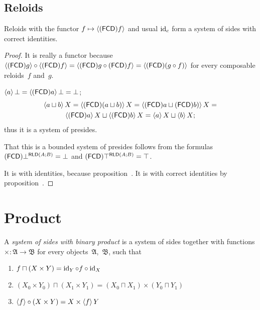 \subsection{Reloids}

\begin{prop}
Reloids with the functor $f\mapsto\left\langle (\mathsf{FCD}) f\right\rangle$ and usual $\operatorname{id}_c$ form a system of sides with correct identities.
\end{prop}

\begin{proof}
It is really a functor because
$\left\langle (\mathsf{FCD}) g\right\rangle\circ\left\langle (\mathsf{FCD}) f\right\rangle = \left\langle (\mathsf{FCD}) g\circ(\mathsf{FCD}) f\right\rangle = \left\langle (\mathsf{FCD})(g\circ f)\right\rangle$
for every composable reloids~$f$ and~$g$.

$\left\langle a\right\rangle\bot = \left\langle (\mathsf{FCD}) a\right\rangle\bot = \bot$;
\begin{multline*}
\left\langle a\sqcup b\right\rangle X = \left\langle (\mathsf{FCD})(a\sqcup b)\right\rangle X = \left\langle (\mathsf{FCD}) a\sqcup(\mathsf{FCD}) b)\right\rangle X = \\
\left\langle (\mathsf{FCD}) a\right\rangle X\sqcup\left\langle (\mathsf{FCD}) b\right\rangle X = \left\langle a\right\rangle X\sqcup\left\langle b\right\rangle X;
\end{multline*}
thus it is a system of presides.

That this is a bounded system of presides follows from the formulas
$(\mathsf{FCD})\bot^{\mathsf{RLD}(A;B)}=\bot$ and $(\mathsf{FCD})\top^{\mathsf{RLD}(A;B)}=\top$.

It is with identities, because proposition~.
It is with correct identities by proposition~.
\end{proof}



\section{Product}

\begin{defn}
A \emph{system of sides with binary product} is a system of sides together with functions $\mathord{\times}:\mathfrak{A}\rightarrow\mathfrak{B}$
for every objects~$\mathfrak{A}$,~$\mathfrak{B}$, such that
\begin{enumerate}
\item \label{f-c-x-y}$f\sqcap(X\times Y) = \operatorname{id}_Y\circ f\circ\operatorname{id}_X$
\item \label{f-xy-x0y0}$(X_0\times Y_0)\sqcap(X_1\times Y_1) = (X_0\sqcap X_1)\times(Y_0\sqcap Y_1)$
\item $\left\langle f\right\rangle\circ(X\times Y) = X\times\left\langle f\right\rangle Y$
\end{enumerate}
\end{defn}


